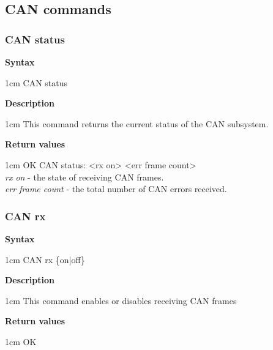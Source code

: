 \documentclass{article}[a4paper]
\begin{document}
\subsection{CAN commands}
\subsubsection{CAN status}
\begin{tcolorbox}
	{\bf Syntax}

	 1cm \dimexpr\linewidth-2cm\relax
	CAN status

	\medskip
	{\bf Description}

	 1cm \dimexpr\linewidth-2cm\relax
	This command returns the current status of the CAN subsystem.

	\medskip
	{\bf Return values}

	 1cm \dimexpr\linewidth-2cm\relax
	OK CAN status: <rx on> <err frame count>
	\medskip \\
	{\it rx on} - the state of receiving CAN frames. \\
	{\it err frame count} - the total number of CAN errors received.
\end{tcolorbox}

\subsubsection{CAN rx}
\begin{tcolorbox}
	{\bf Syntax}

	 1cm \dimexpr\linewidth-2cm\relax
	CAN rx \{on|off\}

	\medskip
	{\bf Description}

	 1cm \dimexpr\linewidth-2cm\relax
	This command enables or disables receiving CAN frames

	\medskip
	{\bf Return values}

	 1cm \dimexpr\linewidth-2cm\relax
	OK
\end{tcolorbox}
\end{document}
